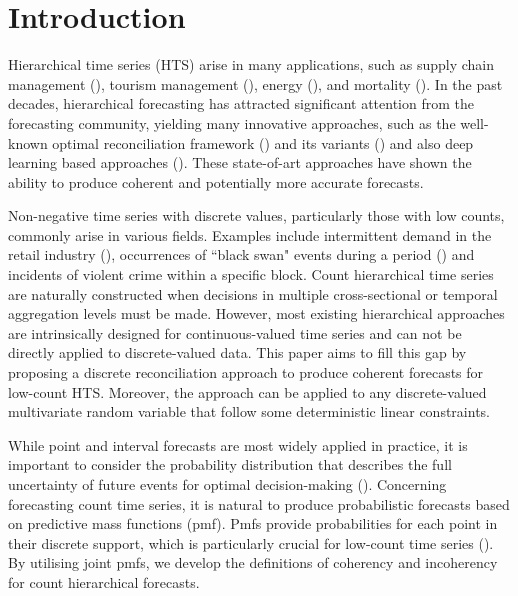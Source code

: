 \documentclass[a4paper,review,12pt,authoryear]{elsarticle}
\theoremstyle{definition}
\begin{document}
\section{Introduction}

Hierarchical time series (HTS) arise in many applications, such as supply chain management (\citealp{babaiDemandForecastingSupply2022}), tourism management (\citealp{kourentzesCrosstemporalCoherentForecasts2019}), energy (\citealp{nystrupTemporalHierarchiesAutocorrelation2020}), and mortality (\citealp{liHierarchicalMortalityForecasting2022}).
In the past decades, hierarchical forecasting has attracted significant attention from the forecasting community, yielding many innovative approaches, such as the well-known optimal reconciliation framework (\citealp{hyndmanOptimalCombinationForecasts2011, wickramasuriyaOptimalForecastReconciliation2019, panagiotelisProbabilisticForecastReconciliation2022}) and its variants () and also deep learning based approaches (\citealp{rangapuramEndtoEndLearningCoherent2021}).
These state-of-art approaches have shown the ability to produce coherent and potentially more accurate forecasts.

Non-negative time series with discrete values, particularly those with low counts, commonly arise in various fields.
Examples include intermittent demand in the retail industry (\citealp{kourentzesElucidateStructureIntermittent2021}), occurrences of ``black swan" events during a period (\citealp{nikolopoulosWeNeedTalk2020}) and incidents of violent crime within a specific block.
Count hierarchical time series are naturally constructed when decisions in multiple cross-sectional or temporal aggregation levels must be made.
However, most existing hierarchical approaches are intrinsically designed for continuous-valued time series and can not be directly applied to discrete-valued data.
This paper aims to fill this gap by proposing a discrete reconciliation approach to produce coherent forecasts for low-count HTS.
Moreover, the approach can be applied to any discrete-valued multivariate random variable that follow some deterministic linear constraints.


While point and interval forecasts are most widely applied in practice, it is important to consider the probability distribution that describes the full uncertainty of future events for optimal decision-making (\citealp{gneitingProbabilisticForecasting2014}).
Concerning forecasting count time series, it is natural to produce probabilistic forecasts based on predictive mass functions (pmf).
Pmfs provide probabilities for each point in their discrete support,
which is particularly crucial for low-count time series (\citealp{freelandForecastingDiscreteValued2004}).
By utilising joint pmfs, we develop the definitions of coherency and incoherency for count hierarchical forecasts.
\end{document}
